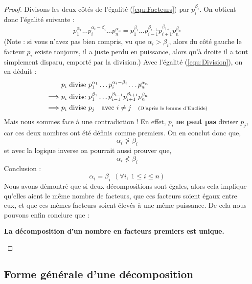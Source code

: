 \begin{proof}
Divisons les deux côtés de l'égalité (\ref{equ:Facteurs}) par $p_i^{\beta_i}$. On obtient donc l'égalité suivante :
\begin{equation} \label{equ:Division}
    p_1^{\alpha_1} \ldots p_i^{\alpha_i-\beta_i} \ldots p_n^{\alpha_n} = p_1^{\beta_1} \ldots p_{i-1}^{\beta_{i-1}} p_{i+1}^{\beta_{i+1}} p_n^{\beta_n}
\end{equation}
(Note : si vous n'avez pas bien compris, vu que $\alpha_i > \beta_i$, alors du côté gauche le facteur $p_i$ existe toujours, il a juste perdu en puissance, alors qu'à droite il a tout simplement disparu, emporté par la division.) \newline
\newline
Avec l'égalité (\ref{equ:Division}), on en déduit :
\begin{align*}
    & p_i \ \text{divise} \ p_1^{\alpha_1} \ldots p_i^{\alpha_i-\beta_i} \ldots p_n^{\alpha_n} \\
    \implies & p_i \ \text{divise} \ p_1^{\beta_1} \ldots p_{i-1}^{\beta_{i-1}} p_{i+1}^{\beta_{i+1}} p_n^{\beta_n} \\
    \implies & p_i \ \text{divise} \ p_j \ \ \ \text{avec} \ i \not= j 
    \ \ \ \text{\scriptsize{(D'après le lemme d'Euclide)}} \\
\end{align*}
Mais nous sommes face à une contradiction ! \newline
En effet, $p_i$ \textbf{ne peut pas} diviser $p_j$, car ces deux nombres ont été définis comme premiers. \newline
On en conclut donc que, $$\alpha_i \not> \beta_i$$ et avec la logique inverse on pourrait aussi prouver que, $$\alpha_i \not< \beta_i$$
\newline
Conclusion : $$\alpha_i = \beta_i \ \ (\forall i, \ 1 \leq i \leq n)$$
\newline
\newline
Nous avons démontré que si deux décompositions sont égales, alors cela implique qu'elles aient le même nombre de facteurs, que ces facteurs soient égaux entre eux, et que ces mêmes facteurs soient élevés à une même puissance. De cela nous pouvons enfin conclure que :
\begin{center}
    \textbf{La décomposition d'un nombre en facteurs premiers est unique.}
\end{center}

\end{proof}


\subsection{Forme générale d'une décomposition}
\label{sec:Decompo}

